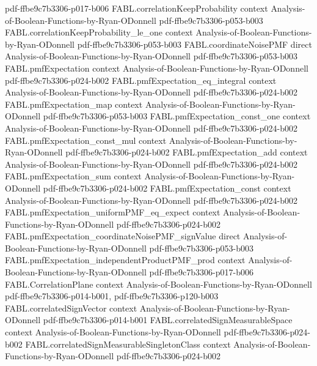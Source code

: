 \begin{theorem}
  {pdf-ffbe9c7b3306-p017-b006}
\proofstep
  {FABL.correlationKeepProbability}
  {context}
  {Analysis-of-Boolean-Functions-by-Ryan-ODonnell}
  {pdf-ffbe9c7b3306-p053-b003}
\proofstep
  {FABL.correlationKeepProbability_le_one}
  {context}
  {Analysis-of-Boolean-Functions-by-Ryan-ODonnell}
  {pdf-ffbe9c7b3306-p053-b003}
\proofstep
  {FABL.coordinateNoisePMF}
  {direct}
  {Analysis-of-Boolean-Functions-by-Ryan-ODonnell}
  {pdf-ffbe9c7b3306-p053-b003}
\proofstep
  {FABL.pmfExpectation}
  {context}
  {Analysis-of-Boolean-Functions-by-Ryan-ODonnell}
  {pdf-ffbe9c7b3306-p024-b002}
\proofstep
  {FABL.pmfExpectation_eq_integral}
  {context}
  {Analysis-of-Boolean-Functions-by-Ryan-ODonnell}
  {pdf-ffbe9c7b3306-p024-b002}
\proofstep
  {FABL.pmfExpectation_map}
  {context}
  {Analysis-of-Boolean-Functions-by-Ryan-ODonnell}
  {pdf-ffbe9c7b3306-p053-b003}
\proofstep
  {FABL.pmfExpectation_const_one}
  {context}
  {Analysis-of-Boolean-Functions-by-Ryan-ODonnell}
  {pdf-ffbe9c7b3306-p024-b002}
\proofstep
  {FABL.pmfExpectation_const_mul}
  {context}
  {Analysis-of-Boolean-Functions-by-Ryan-ODonnell}
  {pdf-ffbe9c7b3306-p024-b002}
\proofstep
  {FABL.pmfExpectation_add}
  {context}
  {Analysis-of-Boolean-Functions-by-Ryan-ODonnell}
  {pdf-ffbe9c7b3306-p024-b002}
\proofstep
  {FABL.pmfExpectation_sum}
  {context}
  {Analysis-of-Boolean-Functions-by-Ryan-ODonnell}
  {pdf-ffbe9c7b3306-p024-b002}
\proofstep
  {FABL.pmfExpectation_const}
  {context}
  {Analysis-of-Boolean-Functions-by-Ryan-ODonnell}
  {pdf-ffbe9c7b3306-p024-b002}
\proofstep
  {FABL.pmfExpectation_uniformPMF_eq_expect}
  {context}
  {Analysis-of-Boolean-Functions-by-Ryan-ODonnell}
  {pdf-ffbe9c7b3306-p024-b002}
\proofstep
  {FABL.pmfExpectation_coordinateNoisePMF_signValue}
  {direct}
  {Analysis-of-Boolean-Functions-by-Ryan-ODonnell}
  {pdf-ffbe9c7b3306-p053-b003}
\proofstep
  {FABL.pmfExpectation_independentProductPMF_prod}
  {context}
  {Analysis-of-Boolean-Functions-by-Ryan-ODonnell}
  {pdf-ffbe9c7b3306-p017-b006}
\proofstep
  {FABL.CorrelationPlane}
  {context}
  {Analysis-of-Boolean-Functions-by-Ryan-ODonnell}
  {pdf-ffbe9c7b3306-p014-b001,
    pdf-ffbe9c7b3306-p120-b003}
\proofstep
  {FABL.correlatedSignVector}
  {context}
  {Analysis-of-Boolean-Functions-by-Ryan-ODonnell}
  {pdf-ffbe9c7b3306-p014-b001}
\proofstep
  {FABL.correlatedSignMeasurableSpace}
  {context}
  {Analysis-of-Boolean-Functions-by-Ryan-ODonnell}
  {pdf-ffbe9c7b3306-p024-b002}
\proofstep
  {FABL.correlatedSignMeasurableSingletonClass}
  {context}
  {Analysis-of-Boolean-Functions-by-Ryan-ODonnell}
  {pdf-ffbe9c7b3306-p024-b002}
\proofstep

\end{theorem}
